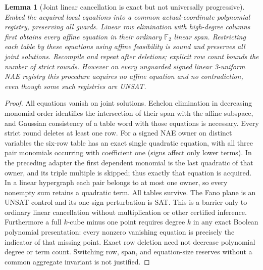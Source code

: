\documentclass[11pt]{article}
\newtheorem{lemma}[theorem]{Lemma}
\begin{document}
\begin{lemma}[Joint linear cancellation is exact but not universally progressive]\label{lem:da18-cancel}
Embed the acquired local equations into a common actual-coordinate polynomial registry, preserving all guards. Linear row elimination with high-degree columns first obtains every affine equation in their ordinary $\mathbb F_2$ linear span. Restricting each table by these equations using affine feasibility is sound and preserves all joint solutions. Recompile and repeat after deletions; explicit row count bounds the number of strict rounds. However on every unguarded signed linear 3-uniform NAE registry this procedure acquires no affine equation and no contradiction, even though some such registries are UNSAT.
\end{lemma}
\begin{proof}
All equations vanish on joint solutions. Echelon elimination in decreasing monomial order identifies the intersection of their span with the affine subspace, and Gaussian consistency of a table word with those equations is necessary. Every strict round deletes at least one row. For a signed NAE owner on distinct variables the six-row table has an exact single quadratic equation, with all three pair monomials occurring with coefficient one (signs affect only lower terms). In the preceding adapter the first dependent monomial is the last quadratic of that owner, and its triple multiple is skipped; thus exactly that equation is acquired. In a linear hypergraph each pair belongs to at most one owner, so every nonempty sum retains a quadratic term. All tables survive. The Fano plane is an UNSAT control and its one-sign perturbation is SAT. This is a barrier only to ordinary linear cancellation without multiplication or other certified inference. Furthermore a full $k$-cube minus one point requires degree $k$ in any exact Boolean polynomial presentation: every nonzero vanishing equation is precisely the indicator of that missing point. Exact row deletion need not decrease polynomial degree or term count. Switching row, span, and equation-size reserves without a common aggregate invariant is not justified.
\end{proof}
\end{document}
